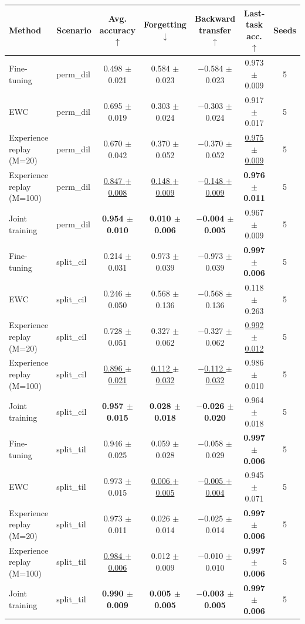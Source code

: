 \begin{tabular}{llccccc}
\toprule
Method & Scenario & Avg. accuracy $\uparrow$ & Forgetting $\downarrow$ & Backward transfer $\uparrow$ & Last-task acc. $\uparrow$ & Seeds \\
\midrule
Fine-tuning & perm\_dil & 0.498 $\pm$ 0.021 & 0.584 $\pm$ 0.023 & $-$0.584 $\pm$ 0.023 & 0.973 $\pm$ 0.009 & 5 \\
EWC & perm\_dil & 0.695 $\pm$ 0.019 & 0.303 $\pm$ 0.024 & $-$0.303 $\pm$ 0.024 & 0.917 $\pm$ 0.017 & 5 \\
Experience replay (M=20) & perm\_dil & 0.670 $\pm$ 0.042 & 0.370 $\pm$ 0.052 & $-$0.370 $\pm$ 0.052 & \underline{0.975 $\pm$ 0.009} & 5 \\
Experience replay (M=100) & perm\_dil & \underline{0.847 $\pm$ 0.008} & \underline{0.148 $\pm$ 0.009} & \underline{$-$0.148 $\pm$ 0.009} & \textbf{0.976 $\pm$ 0.011} & 5 \\
Joint training & perm\_dil & \textbf{0.954 $\pm$ 0.010} & \textbf{0.010 $\pm$ 0.006} & \textbf{$-$0.004 $\pm$ 0.005} & 0.967 $\pm$ 0.009 & 5 \\
\midrule
Fine-tuning & split\_cil & 0.214 $\pm$ 0.031 & 0.973 $\pm$ 0.039 & $-$0.973 $\pm$ 0.039 & \textbf{0.997 $\pm$ 0.006} & 5 \\
EWC & split\_cil & 0.246 $\pm$ 0.050 & 0.568 $\pm$ 0.136 & $-$0.568 $\pm$ 0.136 & 0.118 $\pm$ 0.263 & 5 \\
Experience replay (M=20) & split\_cil & 0.728 $\pm$ 0.051 & 0.327 $\pm$ 0.062 & $-$0.327 $\pm$ 0.062 & \underline{0.992 $\pm$ 0.012} & 5 \\
Experience replay (M=100) & split\_cil & \underline{0.896 $\pm$ 0.021} & \underline{0.112 $\pm$ 0.032} & \underline{$-$0.112 $\pm$ 0.032} & 0.986 $\pm$ 0.010 & 5 \\
Joint training & split\_cil & \textbf{0.957 $\pm$ 0.015} & \textbf{0.028 $\pm$ 0.018} & \textbf{$-$0.026 $\pm$ 0.020} & 0.964 $\pm$ 0.018 & 5 \\
\midrule
Fine-tuning & split\_til & 0.946 $\pm$ 0.025 & 0.059 $\pm$ 0.028 & $-$0.058 $\pm$ 0.029 & \textbf{0.997 $\pm$ 0.006} & 5 \\
EWC & split\_til & 0.973 $\pm$ 0.015 & \underline{0.006 $\pm$ 0.005} & \underline{$-$0.005 $\pm$ 0.004} & 0.945 $\pm$ 0.071 & 5 \\
Experience replay (M=20) & split\_til & 0.973 $\pm$ 0.011 & 0.026 $\pm$ 0.014 & $-$0.025 $\pm$ 0.014 & \textbf{0.997 $\pm$ 0.006} & 5 \\
Experience replay (M=100) & split\_til & \underline{0.984 $\pm$ 0.006} & 0.012 $\pm$ 0.009 & $-$0.010 $\pm$ 0.010 & \textbf{0.997 $\pm$ 0.006} & 5 \\
Joint training & split\_til & \textbf{0.990 $\pm$ 0.009} & \textbf{0.005 $\pm$ 0.005} & \textbf{$-$0.003 $\pm$ 0.005} & \textbf{0.997 $\pm$ 0.006} & 5 \\
\bottomrule
\end{tabular}
